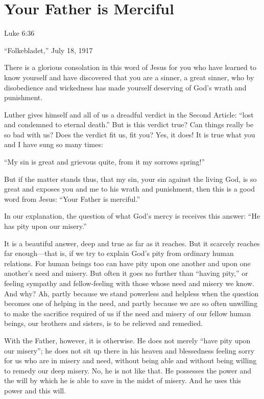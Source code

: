 
\section{Your Father is Merciful}

Luke 6:36

“Folkebladet,” July 18, 1917

There is a glorious consolation in this word of Jesus for you who have learned to know yourself and have discovered that you are a sinner, a great sinner, who by disobedience and wickedness has made yourself deserving of God’s wrath and punishment.

Luther gives himself and all of us a dreadful verdict in the Second Article: “lost and condemned to eternal death.” But is this verdict true? Can things really be so bad with us? Does the verdict fit us, fit you? Yes, it does! It is true what you and I have sung so many times:

“My sin is great and grievous quite,
from it my sorrows spring!”

But if the matter stands thus, that my sin, your sin against the living God, is so great and exposes you and me to his wrath and punishment, then this is a good word from Jesus: “Your Father is merciful.”

In our explanation, the question of what God’s mercy is receives this answer: “He has pity upon our misery.”

It is a beautiful answer, deep and true as far as it reaches. But it scarcely reaches far enough—that is, if we try to explain God’s pity from ordinary human relations. For human beings too can have pity upon one another and upon one another’s need and misery. But often it goes no further than “having pity,” or feeling sympathy and fellow-feeling with those whose need and misery we know. And why? Ah, partly because we stand powerless and helpless when the question becomes one of helping in the need, and partly because we are so often unwilling to make the sacrifice required of us if the need and misery of our fellow human beings, our brothers and sisters, is to be relieved and remedied.

With the Father, however, it is otherwise. He does not merely “have pity upon our misery”; he does not sit up there in his heaven and blessedness feeling sorry for us who are in misery and need, without being able and without being willing to remedy our deep misery. No, he is not like that. He possesses the power and the will by which he is able to save in the midst of misery. And he uses this power and this will.

